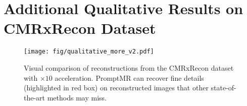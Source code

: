 \documentclass[runningheads]{llncs}
\begin{document}
{\section{Additional Qualitative Results on CMRxRecon Dataset}
\label{app:cmrxrecon_qualitative}



\begin{figure*}[h!]
\centering
\texttt{[image: fig/qualitative\_more\_v2.pdf]}
\caption{Visual comparison of reconstructions from the CMRxRecon dataset with $\times10$ acceleration.
PromptMR can recover fine details (highlighted in red box) on reconstructed images that other state-of-the-art methods may miss.}
\label{fig:qualitative_more}
\end{figure*}

} 
\end{document}

